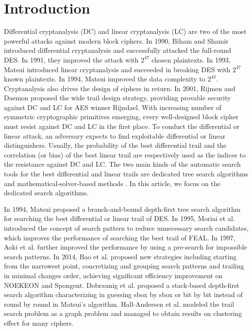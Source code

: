 \section{Introduction}

Differential cryptanalysis (DC) \cite{BS91,BS92} and linear cryptanalysis (LC) \cite{M93,M94_1} are two of the most powerful attacks against modern block ciphers. In 1990, Biham and Shamir introduced differential cryptanalysis and successfully attacked the full-round DES\cite{BS92}. In 1991, they improved the attack with $2^{47}$ chosen plaintexts\cite{BS92}. In 1993, Matsui introduced linear cryptanalysis and succeeded in breaking DES with $2^{47}$ known plaintexts\cite{M93}. In 1994, Matsui improved the data complexity to $2^{43}$\cite{M94_1}. Cryptanalysis also drives the design of ciphers in return. In 2001, Rijmen and Daemon proposed the wide trail design strategy\cite{DR01}, providing provable security against DC and LC for AES winner Rijndael\cite{DR98}. With increasing number of symmetric cryptographic primitives emerging, every well-designed block cipher must resist against DC and LC in the first place. To conduct the differential or linear attack, an adversary expects to find exploitable differential or linear distinguishers. Usually, the probability of the best differential trail and the correlation (or bias) of the best linear trail are respectively used as the indices to the resistance against DC and LC. The two main kinds of the automatic search tools for the best differential and linear trails are dedicated tree search algorithms \cite{M94_2,OMA95,AKM97,BZL14} and mathematical-solver-based methods \cite{MWG12,SHW14-1,SHW14-2,ZZDX19}. In this article, we focus on the dedicated search algorithms. 

In 1994, Matsui proposed a branch-and-bound depth-first tree search algorithm for searching the best differential or linear trail of DES\cite{M94_2}. In 1995, Moriai et al. introduced the concept of search pattern to reduce unnecessary search candidates, which improves the performance of searching the best trail of FEAL\cite{OMA95}. In 1997, Aoki et al. further improved the performance by using a pre-search for impossible search patterns\cite{AKM97}. In 2014, Bao et al. proposed new strategies including starting from the narrowest point, concretizing and grouping search patterns and trailing in minimal changes order, achieving significant efficiency improvement on NOEKEON and Spongent\cite{BZL14}. Dobraunig et al. \cite{DEM15} proposed a stack-based depth-first search algorithm characterizing in guessing sbox by sbox or bit by bit instead of round by round in Matsui's algorithm. Hall-Andersen et al. \cite{HV18} modeled the trail search problem as a graph problem and managed to obtain results on clustering effect for many ciphers. 

